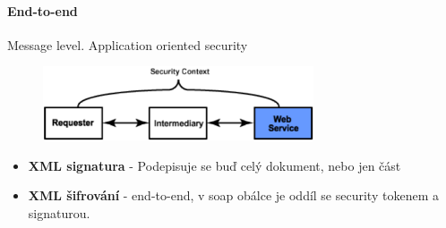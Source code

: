 \paragraph{End-to-end}
Message level. Application oriented security

\begin{figure}[h!]
\centering
\includegraphics[width=80mm]{12/images/security-e2e}
\end{figure}

\begin{itemize}[itemsep=0px]
\item \textbf{XML signatura} - Podepisuje se buď celý dokument, nebo jen část
\item \textbf{XML šifrování} - end-to-end, v soap obálce je oddíl se security tokenem a signaturou.
\end{itemize}

